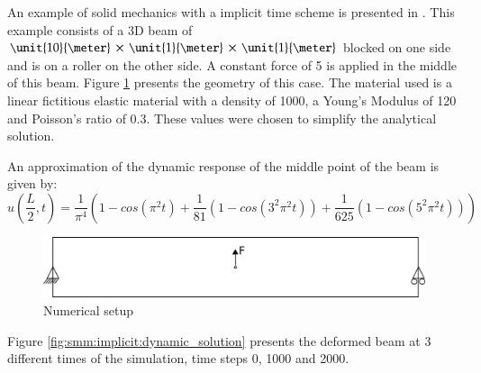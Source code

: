 

An example of solid mechanics with a implicit time scheme  is presented in
.  This example consists of a
3D beam of
$\unit{10}{\meter}\,\times\,\unit{1}{\meter}\,\times\,\unit{1}{\meter}$ blocked
on one side and is on a roller on the other side.  A constant force of
\unit{5}{\kilo\newton} is applied in the middle of this beam.  Figure
\ref{fig:smm:implicit:dynamic} presents the geometry of this case. The material
used is a linear fictitious elastic material with a density of
\unit{1000}{\kilogrampercubicmetre}, a Young's Modulus of
\unit{120}{\mega\pascal} and Poisson's ratio of $0.3$. These values were chosen
to simplify the analytical solution.

An approximation  of the  dynamic response of  the middle  point of the  beam is
given by:
\begin{equation}\label{eqn:smm:implicit}
  u\left(\frac{L}{2}, t\right) = \frac{1}{\pi^4} \left(1 - cos\left(\pi^2 t\right) +
    \frac{1}{81}\left(1 - cos\left(3^2 \pi^2 t\right)\right) +
    \frac{1}{625}\left(1 - cos\left(5^2 \pi^2 t\right)\right)\right)
\end{equation}

\begin{figure}[!htb]
  \centering
  \includegraphics[scale=.6]{figures/implicit_dynamic}
  \caption{Numerical setup}
  \label{fig:smm:implicit:dynamic}
\end{figure}

Figure \ref{fig:smm:implicit:dynamic_solution}  presents the deformed  beam at 3
different times of the simulation, time steps 0, 1000 and 2000.

